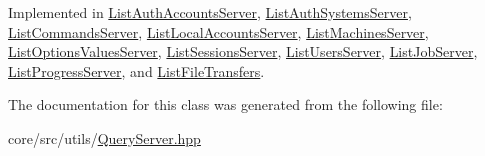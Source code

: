 Implemented in \hyperlink{classListAuthAccountsServer_a0787fa2a4d9dd1b78ea1966d0fafc90d}{ListAuthAccountsServer}, \hyperlink{classListAuthSystemsServer_a4cfd9ed49c97646f1f29889e26246443}{ListAuthSystemsServer}, \hyperlink{classListCommandsServer_ae256dad4b7cb57e73dd3dc2c5dcb3e7b}{ListCommandsServer}, \hyperlink{classListLocalAccountsServer_aab1471d2b577b25471f12652b6e78b31}{ListLocalAccountsServer}, \hyperlink{classListMachinesServer_abbaceb388d6ad47bc9e82a3f33e978a3}{ListMachinesServer}, \hyperlink{classListOptionsValuesServer_a193d667fd5fa247300cebd4af85785d6}{ListOptionsValuesServer}, \hyperlink{classListSessionsServer_a2ce41ba3a29999d9ef1799c990d29b29}{ListSessionsServer}, \hyperlink{classListUsersServer_aa80dfdc8a71c1bbba1423f8b375e1624}{ListUsersServer}, \hyperlink{classListJobServer_a88da8c8e36fce6142758dc5779e0adae}{ListJobServer}, \hyperlink{classListProgressServer_a638132aca020d8168e5185df47e881f0}{ListProgressServer}, and \hyperlink{classListFileTransfers_a51a0f5e3382378220277271122a619d7}{ListFileTransfers}.



The documentation for this class was generated from the following file:\begin{DoxyCompactItemize}
\item 
core/src/utils/\hyperlink{QueryServer_8hpp}{QueryServer.hpp}\end{DoxyCompactItemize}
